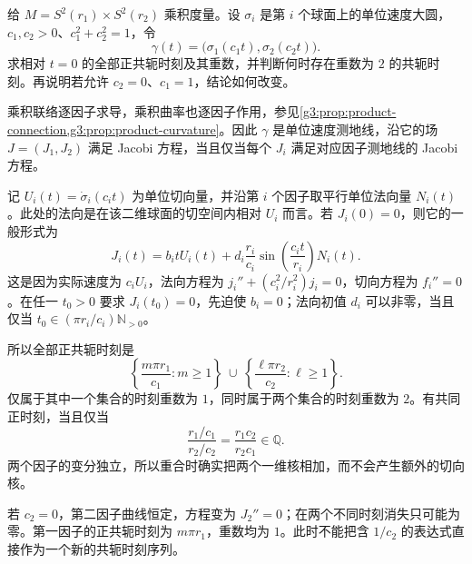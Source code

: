 \begin{exercise}\label{g3:ex:product-spheres-conjugate-times}
	给 \(M=S^2(r_1)\times S^2(r_2)\) 乘积度量。设 \(\sigma_i\) 是第 \(i\) 个球面上的单位速度大圆，\(c_1,c_2>0\)、\(c_1^2+c_2^2=1\)，令
	\[
		\gamma(t)=\bigl(\sigma_1(c_1t),\sigma_2(c_2t)\bigr).
	\]
	求相对 \(t=0\) 的全部正共轭时刻及其重数，并判断何时存在重数为 \(2\) 的共轭时刻。再说明若允许 \(c_2=0\)、\(c_1=1\)，结论如何改变。
\end{exercise}
\begin{solution}
	乘积联络逐因子求导，乘积曲率也逐因子作用，参见\cref{g3:prop:product-connection,g3:prop:product-curvature}。因此 \(\gamma\) 是单位速度测地线，沿它的场 \(J=(J_1,J_2)\) 满足 Jacobi 方程，当且仅当每个 \(J_i\) 满足对应因子测地线的 Jacobi 方程。

	记 \(U_i(t)=\dot\sigma_i(c_it)\) 为单位切向量，并沿第 \(i\) 个因子取平行单位法向量 \(N_i(t)\)。此处的法向是在该二维球面的切空间内相对 \(U_i\) 而言。若 \(J_i(0)=0\)，则它的一般形式为
	\[
		J_i(t)=b_itU_i(t)
		+d_i\frac{r_i}{c_i}\sin\left(\frac{c_it}{r_i}\right)N_i(t).
	\]
	这是因为实际速度为 \(c_iU_i\)，法向方程为 \(j_i''+(c_i^2/r_i^2)j_i=0\)，切向方程为 \(f_i''=0\)。在任一 \(t_0>0\) 要求 \(J_i(t_0)=0\)，先迫使 \(b_i=0\)；法向初值 \(d_i\) 可以非零，当且仅当 \(t_0\in(\pi r_i/c_i)\mathbb N_{>0}\)。

	所以全部正共轭时刻是
	\[
		\left\{\frac{m\pi r_1}{c_1}:m\ge1\right\}
		\ \cup\
		\left\{\frac{\ell\pi r_2}{c_2}:\ell\ge1\right\}.
	\]
	仅属于其中一个集合的时刻重数为 \(1\)，同时属于两个集合的时刻重数为 \(2\)。有共同正时刻，当且仅当
	\[
		\frac{r_1/c_1}{r_2/c_2}=\frac{r_1c_2}{r_2c_1}\in\mathbb Q.
	\]
	两个因子的变分独立，所以重合时确实把两个一维核相加，而不会产生额外的切向核。

	若 \(c_2=0\)，第二因子曲线恒定，方程变为 \(J_2''=0\)；在两个不同时刻消失只可能为零。第一因子的正共轭时刻为 \(m\pi r_1\)，重数均为 \(1\)。此时不能把含 \(1/c_2\) 的表达式直接作为一个新的共轭时刻序列。
\end{solution}

